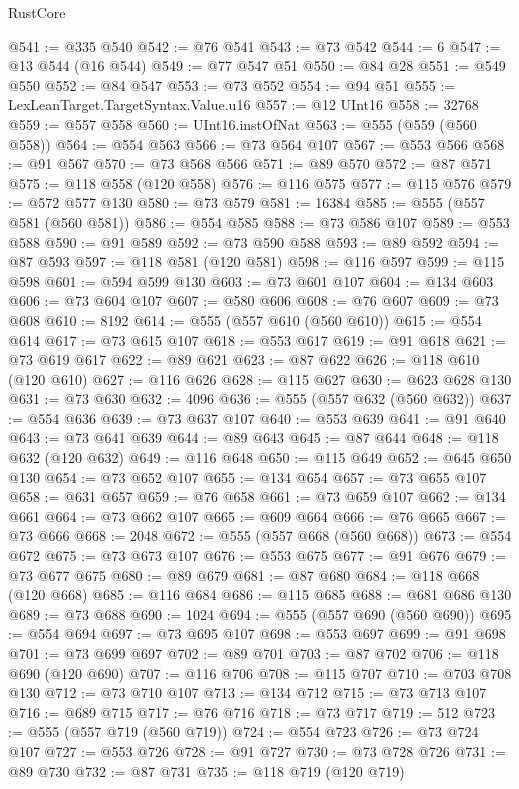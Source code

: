 \begin{lexlean}{RustCore}
\begin{coremodule}
@541 := @335 @540
@542 := @76 @541
@543 := @73 @542
@544 := 6
@547 := @13 @544 (@16 @544)
@549 := @77 @547 @51
@550 := @84 @28
@551 := @549 @550
@552 := @84 @547
@553 := @73 @552
@554 := @94 @51
@555 := LexLeanTarget.TargetSyntax.Value.u16
@557 := @12 UInt16
@558 := 32768
@559 := @557 @558
@560 := UInt16.instOfNat
@563 := @555 (@559 (@560 @558))
@564 := @554 @563
@566 := @73 @564 @107
@567 := @553 @566
@568 := @91 @567
@570 := @73 @568 @566
@571 := @89 @570
@572 := @87 @571
@575 := @118 @558 (@120 @558)
@576 := @116 @575
@577 := @115 @576
@579 := @572 @577 @130
@580 := @73 @579
@581 := 16384
@585 := @555 (@557 @581 (@560 @581))
@586 := @554 @585
@588 := @73 @586 @107
@589 := @553 @588
@590 := @91 @589
@592 := @73 @590 @588
@593 := @89 @592
@594 := @87 @593
@597 := @118 @581 (@120 @581)
@598 := @116 @597
@599 := @115 @598
@601 := @594 @599 @130
@603 := @73 @601 @107
@604 := @134 @603
@606 := @73 @604 @107
@607 := @580 @606
@608 := @76 @607
@609 := @73 @608
@610 := 8192
@614 := @555 (@557 @610 (@560 @610))
@615 := @554 @614
@617 := @73 @615 @107
@618 := @553 @617
@619 := @91 @618
@621 := @73 @619 @617
@622 := @89 @621
@623 := @87 @622
@626 := @118 @610 (@120 @610)
@627 := @116 @626
@628 := @115 @627
@630 := @623 @628 @130
@631 := @73 @630
@632 := 4096
@636 := @555 (@557 @632 (@560 @632))
@637 := @554 @636
@639 := @73 @637 @107
@640 := @553 @639
@641 := @91 @640
@643 := @73 @641 @639
@644 := @89 @643
@645 := @87 @644
@648 := @118 @632 (@120 @632)
@649 := @116 @648
@650 := @115 @649
@652 := @645 @650 @130
@654 := @73 @652 @107
@655 := @134 @654
@657 := @73 @655 @107
@658 := @631 @657
@659 := @76 @658
@661 := @73 @659 @107
@662 := @134 @661
@664 := @73 @662 @107
@665 := @609 @664
@666 := @76 @665
@667 := @73 @666
@668 := 2048
@672 := @555 (@557 @668 (@560 @668))
@673 := @554 @672
@675 := @73 @673 @107
@676 := @553 @675
@677 := @91 @676
@679 := @73 @677 @675
@680 := @89 @679
@681 := @87 @680
@684 := @118 @668 (@120 @668)
@685 := @116 @684
@686 := @115 @685
@688 := @681 @686 @130
@689 := @73 @688
@690 := 1024
@694 := @555 (@557 @690 (@560 @690))
@695 := @554 @694
@697 := @73 @695 @107
@698 := @553 @697
@699 := @91 @698
@701 := @73 @699 @697
@702 := @89 @701
@703 := @87 @702
@706 := @118 @690 (@120 @690)
@707 := @116 @706
@708 := @115 @707
@710 := @703 @708 @130
@712 := @73 @710 @107
@713 := @134 @712
@715 := @73 @713 @107
@716 := @689 @715
@717 := @76 @716
@718 := @73 @717
@719 := 512
@723 := @555 (@557 @719 (@560 @719))
@724 := @554 @723
@726 := @73 @724 @107
@727 := @553 @726
@728 := @91 @727
@730 := @73 @728 @726
@731 := @89 @730
@732 := @87 @731
@735 := @118 @719 (@120 @719)

\end{coremodule}
\end{lexlean}
